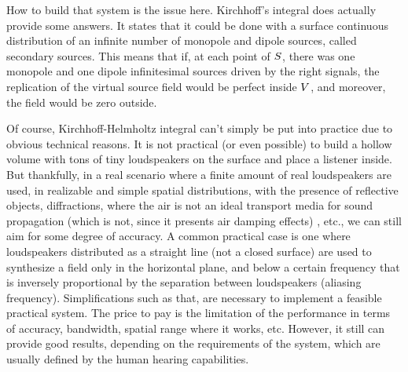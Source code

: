 How to build that system is the issue here. Kirchhoff's integral does actually provide some answers. It states that it could be done with a surface continuous distribution of an infinite number of monopole and dipole sources, called secondary sources. This means that if, at each point of $S$, there was one monopole and one dipole infinitesimal sources driven by the right signals, the replication of the virtual source field would be perfect inside $V$, and moreover, the field would be zero outside.

Of course, Kirchhoff-Helmholtz integral can't simply be put into practice due to obvious technical reasons. It is not practical (or even possible) to build a hollow volume with tons of tiny loudspeakers on the surface and place a listener inside.
But thankfully, in a real scenario where a finite amount of real loudspeakers are used, in realizable and simple spatial distributions, with the presence of reflective objects, diffractions, where the air is not an ideal transport media for sound propagation (which is not, since it presents air damping effects)%
, etc., we can still aim for some degree of accuracy.
A common practical case is one where loudspeakers distributed as a straight line (not a closed surface) are used to synthesize a field only in the horizontal plane, and below a certain frequency that is inversely proportional by the separation between loudspeakers (aliasing frequency). Simplifications such as that, are necessary to implement a feasible practical system. The price to pay is the limitation of the performance in terms of accuracy, bandwidth, spatial range where it works, etc. However, it still can provide good results, depending on the requirements of the system, which are usually defined by the human hearing capabilities.

